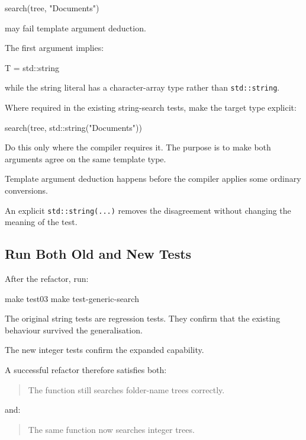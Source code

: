 \documentclass{csc2059practical}
\begin{document}
\begin{cppcode}
search(tree, "Documents")
\end{cppcode}

may fail template argument deduction.

The first argument implies:

\begin{cppcode}
T = std::string
\end{cppcode}

while the string literal has a character-array type rather than
\texttt{std::string}.

Where required in the existing string-search tests, make the target type
explicit:

\begin{cppcode}
search(tree, std::string("Documents"))
\end{cppcode}

Do this only where the compiler requires it. The purpose is to make both
arguments agree on the same template type.

\begin{tipbox}
Template argument deduction happens before the compiler applies some ordinary
conversions.

An explicit \texttt{std::string(...)} removes the disagreement without
changing the meaning of the test.
\end{tipbox}

\subsection{Run Both Old and New Tests}

After the refactor, run:

\begin{terminal}
make test03
make test-generic-search
\end{terminal}

The original string tests are regression tests. They confirm that the existing
behaviour survived the generalisation.

The new integer tests confirm the expanded capability.

A successful refactor therefore satisfies both:

\begin{quote}
The function still searches folder-name trees correctly.
\end{quote}

and:

\begin{quote}
The same function now searches integer trees.
\end{quote}
\end{document}

